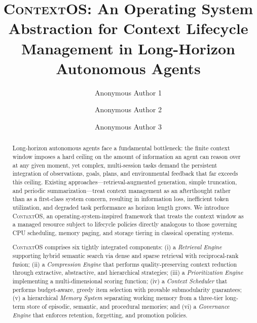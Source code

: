 \documentclass[review,12pt]{elsarticle}
\newcommand{\contextos}{\textsc{ContextOS}}
\begin{document}
\begin{frontmatter}

\title{\contextos: An Operating System Abstraction for Context Lifecycle
       Management in Long-Horizon Autonomous Agents}

\author[inst1]{Anonymous Author 1}
\author[inst1]{Anonymous Author 2}
\author[inst2]{Anonymous Author 3}

\address[inst1]{Anonymous Institution 1}
\address[inst2]{Anonymous Institution 2}

\begin{abstract}
Long-horizon autonomous agents face a fundamental bottleneck: the finite context
window imposes a hard ceiling on the amount of information an agent can reason
over at any given moment, yet complex, multi-session tasks demand the persistent
integration of observations, goals, plans, and environmental feedback that far
exceeds this ceiling.  Existing approaches—retrieval-augmented generation,
simple truncation, and periodic summarization—treat context management as an
afterthought rather than as a first-class system concern, resulting in
information loss, inefficient token utilization, and degraded task performance
as horizon length grows.  We introduce \contextos{}, an operating-system-inspired
framework that treats the context window as a managed resource subject to
lifecycle policies directly analogous to those governing CPU scheduling, memory
paging, and storage tiering in classical operating systems.

\contextos{} comprises six tightly integrated components: (i) a
\emph{Retrieval Engine} supporting hybrid semantic search via dense and sparse
retrieval with reciprocal-rank fusion; (ii) a \emph{Compression Engine} that
performs quality-preserving context reduction through extractive, abstractive,
and hierarchical strategies; (iii) a \emph{Prioritization Engine} implementing
a multi-dimensional scoring function; (iv) a \emph{Context Scheduler} that
performs budget-aware, greedy item selection with provable submodularity
guarantees; (v) a hierarchical \emph{Memory System} separating working
memory from a three-tier long-term store of episodic, semantic, and procedural
memories; and (vi) a \emph{Governance Engine} that enforces retention,
forgetting, and promotion policies.


\end{abstract}
\end{frontmatter}
\end{document}
